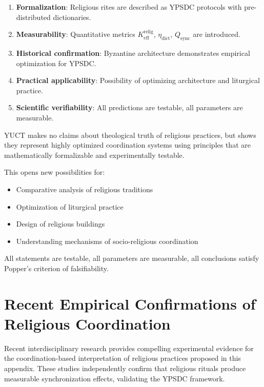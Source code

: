 \documentclass[12pt,a4paper]{article}
\begin{document}
	\begin{enumerate}
		\item \textbf{Formalization}: Religious rites are described as YPSDC protocols with pre-distributed dictionaries.
		\item \textbf{Measurability}: Quantitative metrics $K_{\mathrm{eff}}^{\mathrm{relig}}$, $\eta_{\mathrm{dict}}$, $Q_{\mathrm{sync}}$ are introduced.
		\item \textbf{Historical confirmation}: Byzantine architecture demonstrates empirical optimization for YPSDC.
		\item \textbf{Practical applicability}: Possibility of optimizing architecture and liturgical practice.
		\item \textbf{Scientific verifiability}: All predictions are testable, all parameters are measurable.
	\end{enumerate}
	
	YUCT makes no claims about theological truth of religious practices, but shows they represent highly optimized coordination systems using principles that are mathematically formalizable and experimentally testable.
	
	This opens new possibilities for:
	\begin{itemize}
		\item Comparative analysis of religious traditions
		\item Optimization of liturgical practice
		\item Design of religious buildings
		\item Understanding mechanisms of socio-religious coordination
	\end{itemize}
	
	All statements are testable, all parameters are measurable, all conclusions satisfy Popper's criterion of falsifiability.
	
	\section{Recent Empirical Confirmations of Religious Coordination}
	\label{sec:recent-studies}
	
	Recent interdisciplinary research provides compelling experimental evidence for the coordination-based interpretation of religious practices proposed in this appendix. These studies independently confirm that religious rituals produce measurable synchronization effects, validating the YPSDC framework.
	
\end{document}
